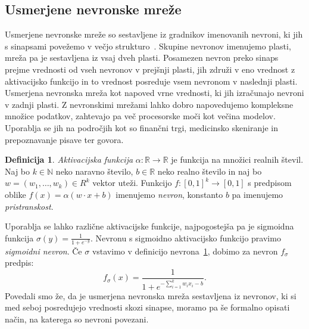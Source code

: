 \documentclass[12pt,a4paper,twoside]{article}
\theoremstyle{definition} %
\newtheorem{definicija}{Definicija}[section]
\theoremstyle{plain} %
\numberwithin{equation}{section}  %
\newcommand{\R}{\mathbb R}
\begin{document}




\subsection{Usmerjene nevronske mreže}

Usmerjene nevronske mreže so sestavljene iz gradnikov imenovanih nevroni, ki jih s sinapsami povežemo v večjo strukturo~\cite{nielsen2015neural}. %
Skupine nevronov imenujemo plasti, mreža pa je sestavljena iz vsaj dveh plasti.
Posamezen nevron preko sinaps prejme vrednosti od vseh nevronov v prejšnji plasti, jih združi v eno vrednost z aktivacijsko funkcijo in to vrednost posreduje vsem nevronom v naslednji plasti.
Usmerjena nevronska mreža kot napoved vrne vrednosti, ki jih izračunajo nevroni v zadnji plasti.
Z nevronskimi mrežami lahko dobro napovedujemo kompleksne množice podatkov, zahtevajo pa več procesorske moči kot večina modelov. 
Uporablja se jih na področjih kot so finančni trgi, medicinsko skeniranje in prepoznavanje pisave ter govora. 

\begin{definicija}
\label{nevron}
	\emph{Aktivacijska funkcija} $\alpha: \R \rightarrow \R$ je funkcija na množici realnih števil.
	Naj bo $k \in \mathbb{N}$ neko naravno število, $b \in \R$ neko realno število in naj bo $w=(w_1,\ldots,w_k) \in R^k$ vektor uteži.
	Funkcijo $f: [0,1]^k \rightarrow [0,1]$ s predpisom oblike $f(x) = \alpha(w\cdot x + b)$ imenujemo \emph{nevron}, konstanto $b$ pa imenujemo \emph{pristranskost}.
\end{definicija}

Uporablja se lahko različne aktivacijske funkcije, najpogostejša pa je sigmoidna funkcija $\sigma(y) = \frac{1}{1+e^{-y}}$. 
Nevronu s sigmoidno aktivacijsko funkcijo pravimo \emph{sigmoidni nevron}. Če $\sigma$ vstavimo v definicijo nevrona~\ref{nevron}, dobimo za nevron $f_{\sigma}$ predpis:
\[
f_{\sigma}(x)= \frac{1}{1+e^{-\sum_{i=1}^k w_i x_i - b}}.
\]
Povedali smo že, da je usmerjena nevronska mreža sestavljena iz nevronov, ki si med seboj posredujejo vrednosti skozi sinapse, moramo pa še formalno opisati način, na katerega so nevroni povezani.
\end{document}
